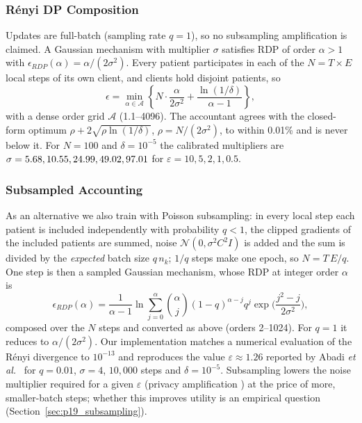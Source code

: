 \documentclass[journal]{IEEEtran}
\begin{document}
\subsubsection{Rényi DP Composition}
Updates are full-batch (sampling rate $q=1$), so no subsampling amplification is claimed. A Gaussian mechanism with multiplier $\sigma$ satisfies RDP of order $\alpha>1$ with $\epsilon_{RDP}(\alpha) = \alpha/(2\sigma^2)$. Every patient participates in each of the $N = T \times E$ local steps of its own client, and clients hold disjoint patients, so
\begin{equation}
\epsilon = \min_{\alpha \in \mathcal{A}} \left\{ N \cdot \frac{\alpha}{2 \sigma^2} + \frac{\ln(1/\delta)}{\alpha - 1} \right\},
\end{equation}
with a dense order grid $\mathcal{A}$ (1.1--4096). The accountant agrees with the closed-form optimum $\rho + 2\sqrt{\rho \ln(1/\delta)}$, $\rho = N/(2\sigma^2)$, to within 0.01\% and is never below it. For $N=100$ and $\delta=10^{-5}$ the calibrated multipliers are $\sigma = 5.68, 10.55, 24.99, 49.02, 97.01$ for $\varepsilon = 10, 5, 2, 1, 0.5$.

\subsubsection{Subsampled Accounting}
As an alternative we also train with Poisson subsampling: in every local step each patient is included independently with probability $q<1$, the clipped gradients of the included patients are summed, noise $\mathcal{N}(0,\sigma^2C^2I)$ is added and the sum is divided by the \emph{expected} batch size $q\,n_k$; $1/q$ steps make one epoch, so $N = T\,E/q$. One step is then a sampled Gaussian mechanism, whose RDP at integer order $\alpha$ is \cite{Mironov2019SampledGaussian, Zhu2019Poisson, Wang2019SubsampledRDP}
\begin{equation}
\epsilon_{RDP}(\alpha) = \frac{1}{\alpha-1}\ln \sum_{j=0}^{\alpha} \binom{\alpha}{j} (1-q)^{\alpha-j} q^{j} \exp\!\Big(\frac{j^2-j}{2\sigma^2}\Big),
\end{equation}
composed over the $N$ steps and converted as above (orders 2--1024). For $q=1$ it reduces to $\alpha/(2\sigma^2)$. Our implementation matches a numerical evaluation of the Rényi divergence to $10^{-13}$ and reproduces the value $\varepsilon \approx 1.26$ reported by Abadi \emph{et al.}\ \cite{Abadi2016DPSGD} for $q=0.01$, $\sigma=4$, $10{,}000$ steps and $\delta=10^{-5}$. Subsampling lowers the noise multiplier required for a given $\varepsilon$ (privacy amplification \cite{Balle2018Amplification}) at the price of more, smaller-batch steps; whether this improves utility is an empirical question (Section~\ref{sec:p19_subsampling}).
\end{document}

